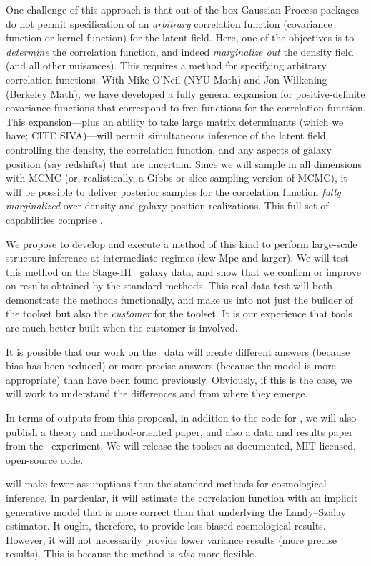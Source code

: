 \documentclass[12pt]{article}
\begin{document}
One challenge of this approach is that out-of-the-box Gaussian Process
packages do not permit specification of an \emph{arbitrary}
correlation function (covariance function or kernel function) for the
latent field.
Here, one of the objectives is to \emph{determine} the correlation
function, and indeed \emph{marginalize out} the density field (and all
other nuisances).
This requires a method for specifying arbitrary correlation functions.
With Mike O'Neil (NYU Math) and Jon Wilkening (Berkeley Math), we have
developed a fully general expansion for positive-definite covariance
functions that correspond to free functions for the correlation
function.
This expansion---plus an ability to take large matrix determinants
(which we have; CITE SIVA)---will permit simultaneous inference of the
latent field controlling the density, the correlation function, and
any aspects of galaxy position (say redshifts) that are uncertain.
Since we will sample in all dimensions with MCMC (or, realistically, a
Gibbs or slice-sampling version of MCMC), it will be possible to
deliver posterior samples for the correlation function \emph{fully
  marginalized} over density and galaxy-position realizations.
This full set of capabilities comprise .

We propose to develop and execute a method of this kind to perform
large-scale structure inference at intermediate regimes (few Mpc and
larger).
We will test this method on the Stage-III \boss\ galaxy data, and show
that we confirm or improve on results obtained by the standard
methods.
This real-data test will both demonstrate the methods functionally,
and make us into not just the builder of the toolset but also the
\emph{customer} for the toolset.
It is our experience that tools are much better built when the
customer is involved.

It is possible that our work on the \boss\ data will create
different answers (because bias has been reduced) or more precise
answers (because the model is more appropriate) than have been found
previously.
Obviously, if this is the case, we will work to understand the
differences and from where they emerge.

In terms of outputs from this proposal, in addition to the code for
, we will also publish a theory and method-oriented
paper, and also a data and results paper from the \boss\ experiment.
We will release the toolset as documented, MIT-licensed, open-source
code.

 will make fewer assumptions than the standard
methods for cosmological inference.
In particular, it will estimate the correlation function with an
implicit generative model that is more correct than that underlying
the Landy--Szalay estimator.
It ought, therefore, to provide less biased cosmological results.
However, it will not necessarily provide lower variance results (more
precise results).
This is because the method is \emph{also} more flexible.
\end{document}
